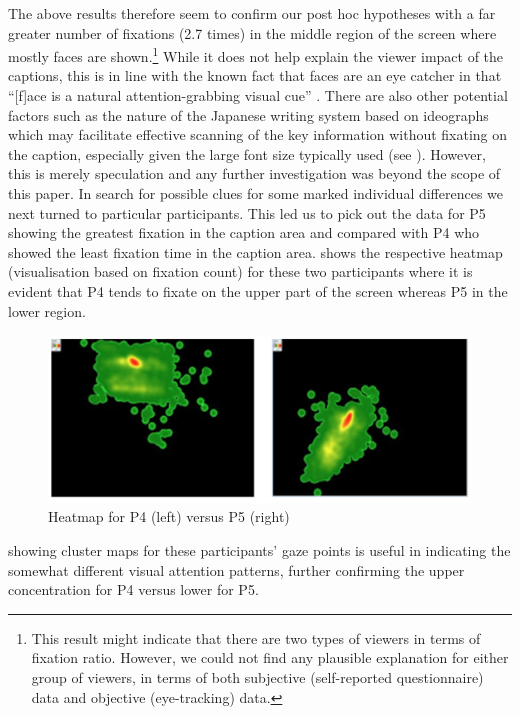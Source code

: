 \documentclass[output=paper]{langsci/langscibook}
\begin{document}
The above results therefore seem to confirm our post hoc hypotheses with a far greater number of fixations (2.7 times) in the middle region of the screen where mostly faces are shown.\footnote{ This result might indicate that there are two types of viewers in terms of fixation ratio. However, we could not find any plausible explanation for either group of viewers, in terms of both subjective (self-reported questionnaire) data and objective (eye-tracking) data.} While it does not help explain the viewer impact of the captions, this is in line with the known fact that faces are an eye catcher in that ``[f]ace is a natural attention-grabbing visual cue'' \citep[264]{perego2010}. There are also other potential factors such as the nature of the Japanese writing system based on ideographs which may facilitate effective scanning of the key information without fixating on the caption, especially given the large font size typically used (see ). However, this is merely speculation and any further investigation was beyond the scope of this paper. In search for possible clues for some marked individual differences we next turned to particular participants.  This led us to pick out the data for P5 showing the greatest fixation in the caption area and compared with P4 who showed the least fixation time in the caption area.   shows the respective heatmap (visualisation based on fixation count) for these two participants where it is evident that P4 tends to fixate on the upper part of the screen whereas P5 in the lower region.
 
\begin{figure}[t]
 \includegraphics[width=\textwidth]{figures/OHagan6.png}
\caption{Heatmap for P4 (left) versus P5 (right)}
\label{ohagan:fig:6}
\end{figure}

 showing cluster maps for these participants' gaze points is useful in indicating the somewhat different visual attention patterns, further confirming the upper concentration for P4 versus lower for P5.
\end{document}
